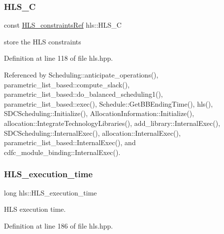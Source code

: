 \mbox{\label{classhls_a3d8e89506a2b39dc89ef71e2782a4c85}} 
\subsubsection{\texorpdfstring{H\+L\+S\+\_\+C}{HLS\_C}}
{\footnotesize\ttfamily const \hyperlink{hls__constraints_8hpp_ac394d1c5cd991614133724294a79182b}{H\+L\+S\+\_\+constraints\+Ref} hls\+::\+H\+L\+S\+\_\+C}



store the H\+LS constraints 



Definition at line 118 of file hls.\+hpp.



Referenced by Scheduling\+::anticipate\+\_\+operations(), parametric\+\_\+list\+\_\+based\+::compute\+\_\+slack(), parametric\+\_\+list\+\_\+based\+::do\+\_\+balanced\+\_\+scheduling1(), parametric\+\_\+list\+\_\+based\+::exec(), Schedule\+::\+Get\+B\+B\+Ending\+Time(), hls(), S\+D\+C\+Scheduling\+::\+Initialize(), Allocation\+Information\+::\+Initialize(), allocation\+::\+Integrate\+Technology\+Libraries(), add\+\_\+library\+::\+Internal\+Exec(), S\+D\+C\+Scheduling\+::\+Internal\+Exec(), allocation\+::\+Internal\+Exec(), parametric\+\_\+list\+\_\+based\+::\+Internal\+Exec(), and cdfc\+\_\+module\+\_\+binding\+::\+Internal\+Exec().

\mbox{\label{classhls_a5a0e69b4bb4c60bd109d21cd985a3a16}} 
\subsubsection{\texorpdfstring{H\+L\+S\+\_\+execution\+\_\+time}{HLS\_execution\_time}}
{\footnotesize\ttfamily long hls\+::\+H\+L\+S\+\_\+execution\+\_\+time}



H\+LS execution time. 



Definition at line 186 of file hls.\+hpp.

\mbox{\label{classhls_af633e6a35e5a7d4074ca9b525955399b}} 
